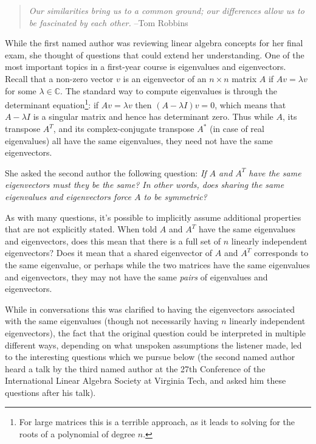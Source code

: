 \documentclass{article}
\newcommand{\vv}{v}%
\newcommand{\vect}[1]{#1}%
\begin{document}
\begin{quote} \emph{Our similarities bring us to a common ground; our differences allow us to be fascinated by each other.} --Tom Robbins
\end{quote}

\medskip

While the first named author was reviewing linear algebra concepts for her final exam,
she thought of questions that could extend her  understanding. One of the most important topics in a first-year course is eigenvalues and eigenvectors. Recall that a non-zero vector $v$ is an eigenvector of an $n \times n$ matrix $A$ if $A\vv = \lambda \vv$ for some $\lambda \in \mathbb{C}$. The standard way to compute eigenvalues  is through the determinant equation\footnote{For large matrices this is a terrible approach, as it leads to solving for the roots of a polynomial of degree $n$.}: if $A\vv = \lambda \vv$ then $(A - \lambda I)\vv = \vect{0}$, which means that $A - \lambda I$ is a singular matrix and hence has determinant zero. Thus while $A$, its transpose $A^T$, and its complex-conjugate transpose $A^\ast$ (in case of real eigenvalues)    all have the same eigenvalues, they need not have the same eigenvectors.
\medskip

She asked the second author the following question: \emph{If $A$ and $A^T$ have the same eigenvectors must they be the same? In other words, does sharing the same eigenvalues and eigenvectors force $A$ to be symmetric?}

\medskip
As with many questions, it's possible to implicitly assume additional properties that are not  explicitly stated. When told $A$ and $A^T$ have the same eigenvalues and eigenvectors, does this mean that there is a full set of $n$ linearly independent eigenvectors? Does it mean that a shared eigenvector of $A$ and $A^T$ corresponds to the same eigenvalue, or perhaps while the two matrices have the same eigenvalues and eigenvectors, they may not have the same \emph{pairs} of eigenvalues and eigenvectors.
\medskip

While in conversations this was clarified to having the eigenvectors associated with the same eigenvalues (though not necessarily having $n$ linearly independent eigenvectors), the fact that the original question could be interpreted in multiple different ways, depending on what unspoken assumptions the listener made, led to the interesting questions which we pursue below (the second named author heard a talk by the third named author at the 27th Conference of the International Linear Algebra Society at Virginia Tech, and asked him these questions after his talk).
\medskip
\end{document}
